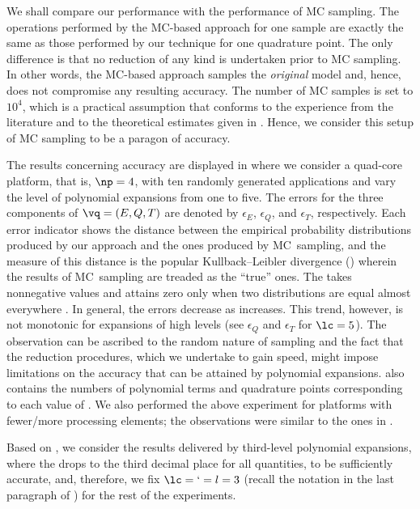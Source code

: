 We shall compare our performance with the performance of \ac{MC} sampling. The
operations performed by the \ac{MC}-based approach for one sample are exactly
the same as those performed by our technique for one quadrature point. The only
difference is that no reduction of any kind is undertaken prior to \ac{MC}
sampling. In other words, the \ac{MC}-based approach samples the \emph{original}
model and, hence, does not compromise any resulting accuracy. The number of
\ac{MC} samples is set to $10^4$, which is a practical assumption that conforms
to the experience from the literature \cite{ukhov2014, lee2013, juan2012,
xiang2010} and to the theoretical estimates given in \cite{diaz-emparanza2002}.
Hence, we consider this setup of \ac{MC} sampling to be a paragon of accuracy.

The results concerning accuracy are displayed in  where we
consider a quad-core platform, that is, $\np = 4$, with ten randomly generated
applications and vary the level of polynomial expansions \lc from one to five.
The errors for the three components of $\vq = (E, Q, T)$ are denoted by
$\epsilon_E$, $\epsilon_Q$, and $\epsilon_T$, respectively. Each error indicator
shows the distance between the empirical probability distributions produced by
our approach and the ones produced by \ac{MC}\ sampling, and the measure of this
distance is the popular Kullback--Leibler divergence () wherein the
results of \ac{MC}\ sampling are treaded as the ``true'' ones. The 
takes nonnegative values and attains zero only when two distributions are equal
almost everywhere \cite{durrett2010}. In general, the errors decrease as \lc
increases. This trend, however, is not monotonic for expansions of high levels
(see $\epsilon_Q$ and $\epsilon_T$ for $\lc = 5$). The observation can be
ascribed to the random nature of sampling and the fact that the reduction
procedures, which we undertake to gain speed, might impose limitations on the
accuracy that can be attained by polynomial expansions.  also
contains the numbers of polynomial terms \nc and quadrature points \nq
corresponding to each value of \lc. We also performed the above experiment for
platforms with fewer/more processing elements; the observations were similar to
the ones in .

Based on , we consider the results delivered by third-level
polynomial expansions, where the  drops to the third decimal place for
all quantities, to be sufficiently accurate, and, therefore, we fix $\lc = \lq =
l = 3$ (recall the notation in the last paragraph of
) for the rest of the experiments.

